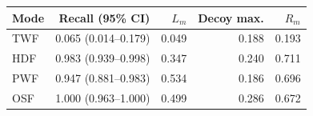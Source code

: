 \begin{tabular}{@{}lrrrr@{}}
\toprule
Mode & Recall (95\% CI) & $L_m$ & Decoy max. & $R_m$ \\
\midrule
TWF & 0.065 (0.014--0.179) & 0.049 & 0.188 & 0.193 \\
HDF & 0.983 (0.939--0.998) & 0.347 & 0.240 & 0.711 \\
PWF & 0.947 (0.881--0.983) & 0.534 & 0.186 & 0.696 \\
OSF & 1.000 (0.963--1.000) & 0.499 & 0.286 & 0.672 \\
\bottomrule
\end{tabular}
